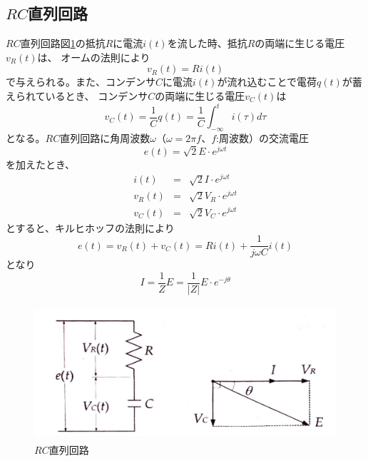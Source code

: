 \documentclass[12pt]{jarticle}
\begin{document}
\subsection{$RC$直列回路}
$RC$直列回路図\ref{fig1}の抵抗$R$に電流$i(t)$を流した時、抵抗$R$の両端に生じる電圧$v_R(t)$は、
オームの法則により
\begin{equation}
    v_R(t)=Ri(t)
    \label{eq1}
\end{equation}
で与えられる。また、コンデンサ$C$に電流$i(t)$が流れ込むことで電荷$q(t)$が蓄えられているとき、
コンデンサ$C$の両端に生じる電圧$v_C(t)$は
\begin{equation}
    v_C(t)=\frac{1}{C}q(t)=\frac{1}{C}\int_{-\infty}^t i(\tau) d\tau
    \label{eq2}
\end{equation}
となる。$RC$直列回路に角周波数$\omega$（$\omega=2\pi f$、$f$:周波数）の交流電圧
\begin{equation}
    e(t)=\sqrt{2}E\cdot e^{j\omega t}
    \label{eq3}
\end{equation}
を加えたとき、
\begin{eqnarray}
    i(t)&=&\sqrt{2}I\cdot e^{j\omega t} \label{eq4}\\
    v_R(t)&=&\sqrt{2}V_R\cdot e^{j\omega t} \label{eq5}\\
    v_C(t)&=&\sqrt{2}V_C\cdot e^{j\omega t} \label{eq6}
\end{eqnarray}
とすると、キルヒホッフの法則により
\begin{equation}
    e(t)=v_R(t)+v_C(t)=Ri(t)+\frac{1}{j\omega C}i(t)
    \label{eq7}
\end{equation}
となり
\begin{equation}
    I=\frac{1}{Z}E=\frac{1}{|Z|}E\cdot e^{-j\theta}
    \label{eq8}
\end{equation}
\begin{figure}[t]
    \begin{center}
        \includegraphics[bb=0 0 1451 604,height=5cm]{report3_fig3.24.jpg}
    \end{center}
    \caption{$RC$直列回路}
    \label{fig1}
\end{figure}
\end{document}
